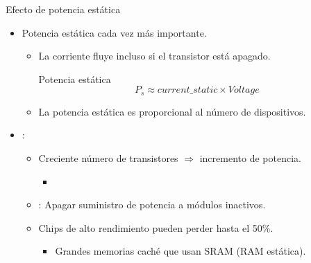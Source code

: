 \begin{frame}[t]{Efecto de potencia estática}
\begin{itemize}
  \item Potencia estática cada vez más importante.
    \begin{itemize}
      \item La corriente fluye incluso si el transistor está apagado.

\pause
\begin{block}{Potencia estática}
\begin{displaymath}
P_s \approx current\_{static} \times Voltage
\end{displaymath}
\end{block}

      \pause
      \item La potencia estática es proporcional al número de dispositivos.
    \end{itemize}

  \item {}:
    \begin{itemize}
      \item Creciente número de transistores $\Rightarrow$ incremento de potencia.
        \begin{itemize}
          \item {}
        \end{itemize}

      \pause
      \item {}: 
            Apagar suministro de potencia a módulos inactivos.            

      \pause
      \item Chips de alto rendimiento pueden perder hasta el 50\%.
        \begin{itemize}
          \item Grandes memorias caché que usan SRAM (RAM estática).
        \end{itemize}
    \end{itemize}
\end{itemize}
\end{frame}
